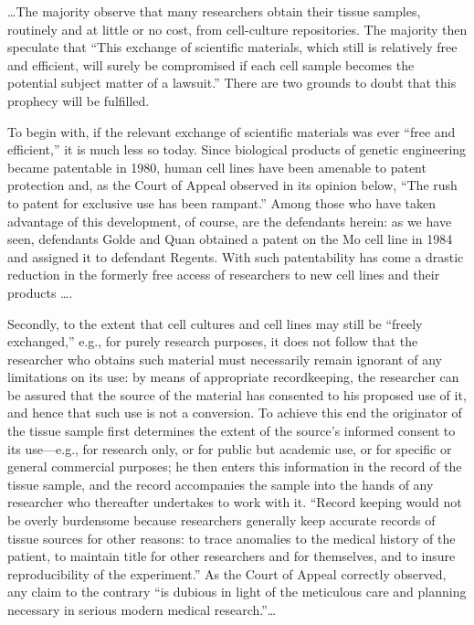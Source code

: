 {\dots}The majority observe that many researchers obtain their tissue samples,
routinely and at little or no cost, from cell-culture repositories. The
majority then speculate that ``This exchange of scientific materials, which
still is relatively free and efficient, will surely be compromised if each cell
sample becomes the potential subject matter of a lawsuit.'' There are two
grounds to doubt that this prophecy will be fulfilled.

To begin with, if the relevant exchange of scientific materials was ever ``free
and efficient,'' it is much less so today. Since biological products of genetic
engineering became patentable in 1980, human cell lines have been amenable to
patent protection and, as the Court of Appeal observed in its opinion below,
``The rush to patent for exclusive use has been rampant.'' Among those who have
taken advantage of this development, of course, are the defendants herein: as
we have seen, defendants Golde and Quan obtained a patent on the Mo cell line
in 1984 and assigned it to defendant Regents. With such patentability has come
a drastic reduction in the formerly free access of researchers to new cell
lines and their products {\dots}.

Secondly, to the extent that cell cultures and cell lines may still be ``freely
exchanged,'' e.g., for purely research purposes, it does not follow that the
researcher who obtains such material must necessarily remain ignorant of any
limitations on its use: by means of appropriate recordkeeping, the researcher
can be assured that the source of the material has consented to his proposed
use of it, and hence that such use is not a conversion. To achieve this end the
originator of the tissue sample first determines the extent of the source's
informed consent to its use---e.g., for research only, or for public but
academic use, or for specific or general commercial purposes; he then enters
this information in the record of the tissue sample, and the record accompanies
the sample into the hands of any researcher who thereafter undertakes to work
with it. ``Record keeping would not be overly burdensome because researchers
generally keep accurate records of tissue sources for other reasons: to trace
anomalies to the medical history of the patient, to maintain title for other
researchers and for themselves, and to insure reproducibility of the
experiment.'' As the Court of Appeal correctly observed, any claim to the
contrary ``is dubious in light of the meticulous care and planning necessary in
serious modern medical research.''{\dots}


